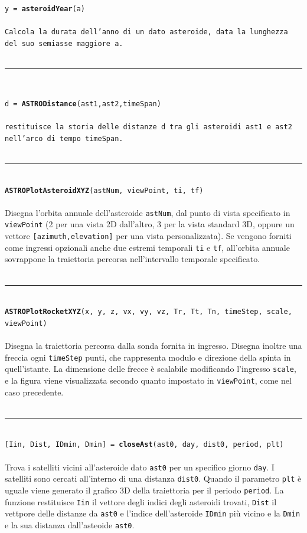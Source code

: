 \documentclass[12pt]{article}
\newcommand\class[1]{\textcolor{NavyBlue}{\textbf{#1}}}
\newcommand{\HRule}{\rule{\linewidth}{0.1mm}}
\begin{document}
{\tt y = {\class{asteroidYear}(a)}\\
\\Calcola la durata dell'anno di un dato asteroide, data la lunghezza del suo semiasse maggiore {\tt a}.\\
\\
\HRule
\\
{\tt d = {\class{ASTRODistance}(ast1,ast2,timeSpan)}\\
\\restituisce la storia delle distanze {\tt d} tra gli asteroidi {\tt ast1} e {\tt ast2} nell'arco di tempo {\tt timeSpan}.\\
\\
\HRule
\\
{\tt \class{ASTROPlotAsteroidXYZ}(astNum, viewPoint, ti, tf)}\\
\\Disegna l'orbita annuale dell'asteroide {\tt astNum}, dal punto di vista specificato in {\tt viewPoint} (2 per una vista 2D dall'altro, 3 per la vista standard 3D, oppure un vettore {\tt [azimuth,elevation]} per una vista personalizzata). Se vengono forniti come ingressi opzionali anche due estremi temporali {\tt ti} e {\tt tf}, all'orbita annuale sovrappone la traiettoria percorsa nell'intervallo temporale specificato.\\
\\
\HRule
\\
{\tt \class{ASTROPlotRocketXYZ}(x, y, z, vx, vy, vz, Tr, Tt, Tn, timeStep, scale, viewPoint)}\\
\\Disegna la traiettoria percorsa dalla sonda fornita in ingresso. Disegna inoltre una freccia ogni {\tt timeStep} punti, che rappresenta modulo e direzione della spinta in quell'istante. La dimensione delle frecce è scalabile modificando l'ingresso {\tt scale}, e la figura viene visualizzata secondo quanto impostato in {\tt viewPoint}, come nel caso precedente.\\
\\
\HRule
\\
{\tt [Iin, Dist, IDmin, Dmin] = \class{closeAst}(ast0, day, dist0, period, plt)}\\
\\Trova i satelliti vicini all'asteroide dato {\tt ast0} per un specifico giorno {\tt day}. I satelliti sono cercati all'interno di una distanza {\tt dist0}. Quando il parametro {\tt plt} è uguale viene generato il grafico 3D della traiettoria per il periodo {\tt period}. La funzione restituisce {\tt Iin} il vettore degli indici degli asteroidi trovati, {\tt Dist} il vettpore delle distanze da {\tt ast0} e l'indice dell'asteroide {\tt IDmin} più vicino e la {\tt Dmin} e la sua distanza dall'asteoide {\tt ast0}.
}}
\end{document}
